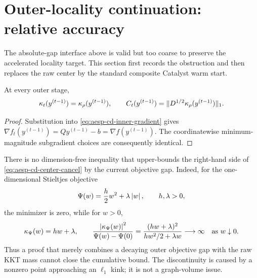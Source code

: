 \section{Outer-locality continuation: relative accuracy}
\label{sec:aesp-cd-relative}

The absolute-gap interface above is valid but too coarse to preserve the
accelerated locality target.  This section first records the obstruction and
then replaces the raw center by the standard composite Catalyst warm start.

\begin{lemma}
\label{lem:aesp-cd-center-cancel}
At every outer stage,
\begin{equation}
 \kappa_t(y^{(t-1)})=\kappa_\rho(y^{(t-1)}),
 \qquad
 C_t(y^{(t-1)})
 =\lVert D^{1/2}\kappa_\rho(y^{(t-1)})\rVert_1.
 \label{eq:aesp-cd-center-cancel}
\end{equation}
\end{lemma}

\begin{proof}
Substitution into \cref{eq:aesp-cd-inner-gradient} gives
$\nabla f_t(y^{(t-1)})=Qy^{(t-1)}-b=\nabla f(y^{(t-1)})$.
The coordinatewise minimum-magnitude subgradient choices are consequently
identical.
\end{proof}

There is no dimension-free inequality that upper-bounds the right-hand side
of \cref{eq:aesp-cd-center-cancel} by the current objective gap.  Indeed, for
the one-dimensional Stieltjes objective
\begin{equation*}
 \Psi(w)=\frac{h}{2}w^2+\lambda\left\lvert w \right\rvert,
 \qquad h,\lambda>0,
\end{equation*}
the minimizer is zero, while for $w>0$,
\begin{equation*}
 \kappa_\Psi(w)=hw+\lambda,
 \qquad
 \frac{\left\lvert \kappa_\Psi(w) \right\rvert^2}{\Psi(w)-\Psi(0)}
 =\frac{(hw+\lambda)^2}{hw^2/2+\lambda w}
 \longrightarrow\infty
 \quad\text{as }w\downarrow0.
\end{equation*}
Thus a proof that merely combines a decaying outer objective gap with the raw
KKT mass cannot close the cumulative bound.  The discontinuity is caused by
a nonzero point approaching an $\ell_1$ kink; it is not a graph-volume issue.

